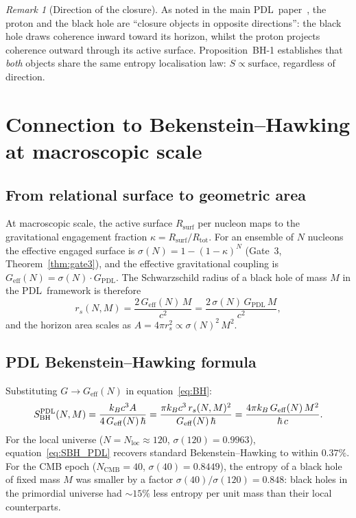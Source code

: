\documentclass[11pt,a4paper]{article}
\theoremstyle{plain}
\theoremstyle{definition}
\theoremstyle{remark}
\newtheorem{remark}[theorem]{Remark}
\newcommand{\PDL}{\textsc{PDL}}
\newcommand{\Rtot}{R_{\mathrm{tot}}}
\newcommand{\Rsurf}{R_{\mathrm{surf}}}
\newcommand{\kap}{\kappa}
\newcommand{\sig}{\sigma}
\newcommand{\GPDL}{G_{\mathrm{PDL}}}
\newcommand{\Geff}{G_{\mathrm{eff}}}
\newcommand{\hb}{\hbar}
\newcommand{\SBH}{S_{\mathrm{BH}}}
\begin{document}
\begin{remark}[Direction of the closure]
\label{rem:direction}
As noted in the main \PDL\ paper~\cite{PDL_Main_2026}, the proton and the black hole
are ``closure objects in opposite directions'': the black hole draws coherence inward
toward its horizon, whilst the proton projects coherence outward through its active
surface. Proposition~BH-1 establishes that \emph{both} objects share the same
entropy localisation law: $S \propto \text{surface}$, regardless of direction.
\end{remark}

\section{Connection to Bekenstein--Hawking at macroscopic scale}
\label{sec:macro}

\subsection{From relational surface to geometric area}

At macroscopic scale, the active surface $\Rsurf$ per nucleon maps to the
gravitational engagement fraction $\kap = \Rsurf/\Rtot$. For an ensemble of $N$
nucleons the effective engaged surface is $\sig(N) = 1-(1-\kap)^N$ (Gate~3,
Theorem~\ref{thm:gate3}), and the effective gravitational coupling is
$\Geff(N) = \sig(N)\cdot\GPDL$. The Schwarzschild radius of a black hole of
mass $M$ in the \PDL\ framework is therefore
\begin{equation}
  r_s(N,M) = \frac{2\,\Geff(N)\,M}{c^2} = \frac{2\,\sig(N)\,\GPDL\,M}{c^2},
  \label{eq:rs_N}
\end{equation}
and the horizon area scales as $A = 4\pi r_s^2 \propto \sig(N)^2\,M^2$.

\subsection{PDL Bekenstein--Hawking formula}

Substituting $G \to \Geff(N)$ in equation~\eqref{eq:BH}:
\begin{equation}
  \SBH^{\PDL}(N,M) = \frac{k_B c^3 A}{4\,\Geff(N)\,\hb}
  = \frac{\pi k_B c^3\,r_s(N,M)^2}{\Geff(N)\,\hb}
  = \frac{4\pi k_B\,\Geff(N)\,M^2}{\hb\,c}.
  \label{eq:SBH_PDL}
\end{equation}
For the local universe ($N = N_{\mathrm{loc}} \approx 120$, $\sig(120) = 0.9963$),
equation~\eqref{eq:SBH_PDL} recovers standard Bekenstein--Hawking to within $0.37\%$.
For the CMB epoch ($N_{\mathrm{CMB}} = 40$, $\sig(40) = 0.8449$), the entropy of a
black hole of fixed mass $M$ was smaller by a factor $\sig(40)/\sig(120) = 0.848$:
black holes in the primordial universe had $\sim 15\%$ less entropy per unit mass
than their local counterparts.
\end{document}
